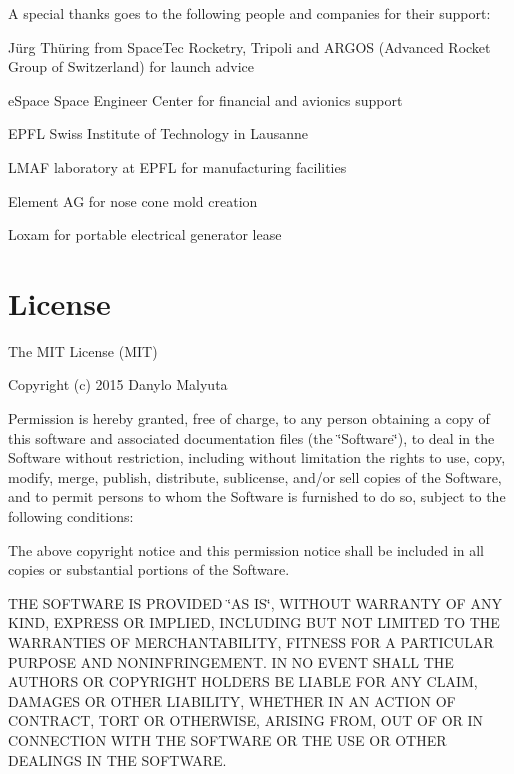 A special thanks goes to the following people and companies for their support\-:
\begin{DoxyItemize}
\item Jürg Thüring from Space\-Tec Rocketry, Tripoli and A\-R\-G\-O\-S (Advanced Rocket Group of Switzerland) for launch advice
\item e\-Space Space Engineer Center for financial and avionics support
\item E\-P\-F\-L Swiss Institute of Technology in Lausanne
\item L\-M\-A\-F laboratory at E\-P\-F\-L for manufacturing facilities
\item Element A\-G for nose cone mold creation
\item Loxam for portable electrical generator lease
\end{DoxyItemize}\hypertarget{index_License}{}\section{License}\label{index_License}
The M\-I\-T License (M\-I\-T)

Copyright (c) 2015 Danylo Malyuta

Permission is hereby granted, free of charge, to any person obtaining a copy of this software and associated documentation files (the \char`\"{}\-Software\char`\"{}), to deal in the Software without restriction, including without limitation the rights to use, copy, modify, merge, publish, distribute, sublicense, and/or sell copies of the Software, and to permit persons to whom the Software is furnished to do so, subject to the following conditions\-:

The above copyright notice and this permission notice shall be included in all copies or substantial portions of the Software.

T\-H\-E S\-O\-F\-T\-W\-A\-R\-E I\-S P\-R\-O\-V\-I\-D\-E\-D \char`\"{}\-A\-S I\-S\char`\"{}, W\-I\-T\-H\-O\-U\-T W\-A\-R\-R\-A\-N\-T\-Y O\-F A\-N\-Y K\-I\-N\-D, E\-X\-P\-R\-E\-S\-S O\-R I\-M\-P\-L\-I\-E\-D, I\-N\-C\-L\-U\-D\-I\-N\-G B\-U\-T N\-O\-T L\-I\-M\-I\-T\-E\-D T\-O T\-H\-E W\-A\-R\-R\-A\-N\-T\-I\-E\-S O\-F M\-E\-R\-C\-H\-A\-N\-T\-A\-B\-I\-L\-I\-T\-Y, F\-I\-T\-N\-E\-S\-S F\-O\-R A P\-A\-R\-T\-I\-C\-U\-L\-A\-R P\-U\-R\-P\-O\-S\-E A\-N\-D N\-O\-N\-I\-N\-F\-R\-I\-N\-G\-E\-M\-E\-N\-T. I\-N N\-O E\-V\-E\-N\-T S\-H\-A\-L\-L T\-H\-E A\-U\-T\-H\-O\-R\-S O\-R C\-O\-P\-Y\-R\-I\-G\-H\-T H\-O\-L\-D\-E\-R\-S B\-E L\-I\-A\-B\-L\-E F\-O\-R A\-N\-Y C\-L\-A\-I\-M, D\-A\-M\-A\-G\-E\-S O\-R O\-T\-H\-E\-R L\-I\-A\-B\-I\-L\-I\-T\-Y, W\-H\-E\-T\-H\-E\-R I\-N A\-N A\-C\-T\-I\-O\-N O\-F C\-O\-N\-T\-R\-A\-C\-T, T\-O\-R\-T O\-R O\-T\-H\-E\-R\-W\-I\-S\-E, A\-R\-I\-S\-I\-N\-G F\-R\-O\-M, O\-U\-T O\-F O\-R I\-N C\-O\-N\-N\-E\-C\-T\-I\-O\-N W\-I\-T\-H T\-H\-E S\-O\-F\-T\-W\-A\-R\-E O\-R T\-H\-E U\-S\-E O\-R O\-T\-H\-E\-R D\-E\-A\-L\-I\-N\-G\-S I\-N T\-H\-E S\-O\-F\-T\-W\-A\-R\-E. 